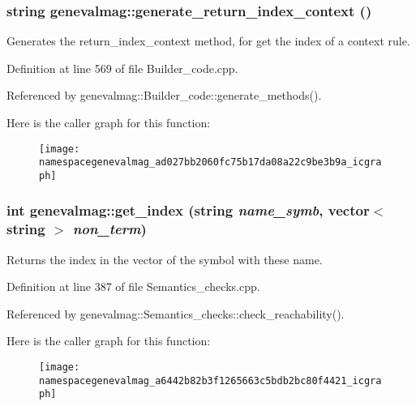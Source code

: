 \hypertarget{namespacegenevalmag_ad027bb2060fc75b17da08a22c9be3b9a}{
\subsubsection[{generate\_\-return\_\-index\_\-context}]{\setlength{\rightskip}{0pt plus 5cm}string genevalmag::generate\_\-return\_\-index\_\-context ()}}
\label{namespacegenevalmag_ad027bb2060fc75b17da08a22c9be3b9a}
Generates the return\_\-index\_\-context method, for get the index of a context rule. 

Definition at line 569 of file Builder\_\-code.cpp.



Referenced by genevalmag::Builder\_\-code::generate\_\-methods().



Here is the caller graph for this function:\nopagebreak
\begin{figure}[H]
\begin{center}
\leavevmode
\texttt{[image: namespacegenevalmag\_ad027bb2060fc75b17da08a22c9be3b9a\_icgraph]}
\end{center}
\end{figure}


\hypertarget{namespacegenevalmag_a6442b82b3f1265663c5bdb2bc80f4421}{
\subsubsection[{get\_\-index}]{\setlength{\rightskip}{0pt plus 5cm}int genevalmag::get\_\-index (string {\em name\_\-symb}, \/  vector$<$ string $>$ {\em non\_\-term})}}
\label{namespacegenevalmag_a6442b82b3f1265663c5bdb2bc80f4421}
Returns the index in the vector of the symbol with these name. 

Definition at line 387 of file Semantics\_\-checks.cpp.



Referenced by genevalmag::Semantics\_\-checks::check\_\-reachability().



Here is the caller graph for this function:\nopagebreak
\begin{figure}[H]
\begin{center}
\leavevmode
\texttt{[image: namespacegenevalmag\_a6442b82b3f1265663c5bdb2bc80f4421\_icgraph]}
\end{center}
\end{figure}


